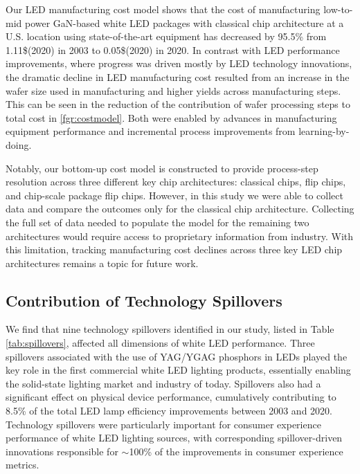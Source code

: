 \documentclass[parskip=full]{article}
\begin{document}
Our LED manufacturing cost model shows that the cost of manufacturing low-to-mid power GaN-based white LED packages with classical chip architecture at a U.S. location using state-of-the-art equipment has decreased by 95.5\% from 1.11\$(2020) in 2003 to 0.05\$(2020) in 2020. In contrast with LED performance improvements, where progress was driven mostly by LED technology innovations, the dramatic decline in LED manufacturing cost resulted from an increase in the wafer size used in manufacturing and higher yields across manufacturing steps. This can be seen in the reduction of the contribution of wafer processing steps to total cost in \ref{fgr:costmodel}. Both were enabled by advances in manufacturing equipment performance and incremental process improvements from learning-by-doing.

Notably, our bottom-up cost model is constructed to provide process-step resolution across three different key chip architectures: classical chips, flip chips, and chip-scale package flip chips. However, in this study we were able to collect data and compare the outcomes only for the classical chip architecture. Collecting the full set of data needed to populate the model for the remaining two architectures would require access to proprietary information from industry. With this limitation, tracking manufacturing cost declines across three key LED chip architectures remains a topic for future work.

\subsection{Contribution of Technology Spillovers}
\label{subsec:spillovers}

We find that nine technology spillovers identified in our study, listed in Table \ref{tab:spillovers}, affected all dimensions of white LED performance. Three spillovers associated with the use of YAG/YGAG phosphors in LEDs played the key role in the first commercial white LED lighting products, essentially enabling the solid-state lighting market and industry of today. Spillovers also had a significant effect on physical device performance, cumulatively contributing to 8.5\% of the total LED lamp efficiency improvements between 2003 and 2020. Technology spillovers were particularly important for consumer experience performance of white LED lighting sources, with corresponding spillover-driven innovations responsible for $\sim$100\% of the improvements in consumer experience metrics. 
\end{document}
